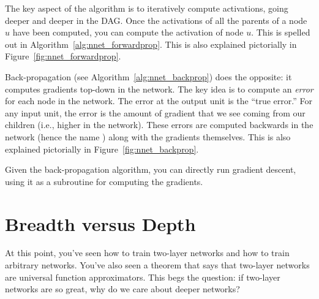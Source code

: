 
The key aspect of the  algorithm is to
iteratively compute activations, going deeper and deeper in the DAG.
Once the activations of all the parents of a node $u$ have been
computed, you can compute the activation of node $u$.  This is spelled
out in Algorithm~\ref{alg:nnet_forwardprop}.  This is also explained
pictorially in Figure~\ref{fig:nnet_forwardprop}.


Back-propagation (see Algorithm~\ref{alg:nnet_backprop}) does the
opposite: it computes gradients top-down in the network.  The key idea
is to compute an \emph{error} for each node in the network.  The error
at the output unit is the ``true error.''  For any input unit, the
error is the amount of gradient that we see coming from our children
(i.e., higher in the network).  These errors are computed backwards in
the network (hence the name ) along with the
gradients themselves.  This is also explained pictorially in
Figure~\ref{fig:nnet_backprop}.

Given the back-propagation algorithm, you can directly run gradient
descent, using it as a subroutine for computing the gradients.

\section{Breadth versus Depth}

At this point, you've seen how to train two-layer networks and how to
train arbitrary networks.  You've also seen a theorem that says that
two-layer networks are universal function approximators.  This begs
the question: if two-layer networks are so great, why do we care about
deeper networks?

